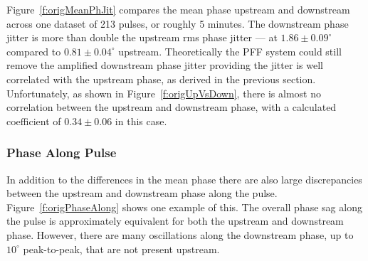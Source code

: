 Figure~\ref{f:origMeanPhJit} compares the mean phase upstream and downstream across one dataset of 213 pulses, or roughly 5 minutes. The downstream phase jitter is more than double the upstream rms phase jitter --- at \(1.86\pm0.09^\circ\) compared to \(0.81\pm0.04^\circ\) upstream. Theoretically the PFF system could still remove the amplified downstream phase jitter providing the jitter is well correlated with the upstream phase, as derived in the previous section. Unfortunately, as shown in Figure~\ref{f:origUpVsDown}, there is almost no correlation between the upstream and downstream phase, with a calculated coefficient of \(0.34\pm0.06\) in this case.


\subsubsection{Phase Along Pulse}

In addition to the differences in the mean phase there are also large discrepancies between the upstream and downstream phase along the pulse. Figure~\ref{f:origPhaseAlong} shows one example of this. The overall phase sag along the pulse is approximately equivalent for both the upstream and downstream phase. However, there are many oscillations along the downstream phase, up to \(10^\circ\) peak-to-peak, that are not present upstream.

